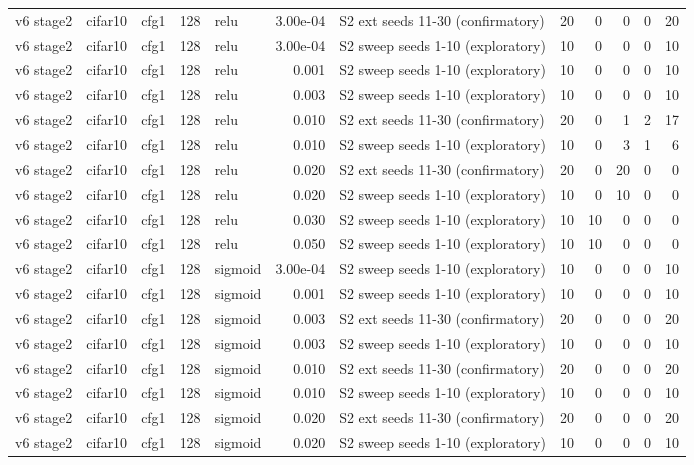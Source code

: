 \begin{table}[htbp]
{\begin{tabular}{@{}lllrlrlrrrrr@{}}
v6 stage2 & cifar10 & cfg1 & 128 & relu & 3.00e-04 & S2 ext seeds 11-30 (confirmatory) & 20 & 0 & 0 & 0 & 20 \\
v6 stage2 & cifar10 & cfg1 & 128 & relu & 3.00e-04 & S2 sweep seeds 1-10 (exploratory) & 10 & 0 & 0 & 0 & 10 \\
v6 stage2 & cifar10 & cfg1 & 128 & relu & 0.001 & S2 sweep seeds 1-10 (exploratory) & 10 & 0 & 0 & 0 & 10 \\
v6 stage2 & cifar10 & cfg1 & 128 & relu & 0.003 & S2 sweep seeds 1-10 (exploratory) & 10 & 0 & 0 & 0 & 10 \\
v6 stage2 & cifar10 & cfg1 & 128 & relu & 0.010 & S2 ext seeds 11-30 (confirmatory) & 20 & 0 & 1 & 2 & 17 \\
v6 stage2 & cifar10 & cfg1 & 128 & relu & 0.010 & S2 sweep seeds 1-10 (exploratory) & 10 & 0 & 3 & 1 & 6 \\
v6 stage2 & cifar10 & cfg1 & 128 & relu & 0.020 & S2 ext seeds 11-30 (confirmatory) & 20 & 0 & 20 & 0 & 0 \\
v6 stage2 & cifar10 & cfg1 & 128 & relu & 0.020 & S2 sweep seeds 1-10 (exploratory) & 10 & 0 & 10 & 0 & 0 \\
v6 stage2 & cifar10 & cfg1 & 128 & relu & 0.030 & S2 sweep seeds 1-10 (exploratory) & 10 & 10 & 0 & 0 & 0 \\
v6 stage2 & cifar10 & cfg1 & 128 & relu & 0.050 & S2 sweep seeds 1-10 (exploratory) & 10 & 10 & 0 & 0 & 0 \\
v6 stage2 & cifar10 & cfg1 & 128 & sigmoid & 3.00e-04 & S2 sweep seeds 1-10 (exploratory) & 10 & 0 & 0 & 0 & 10 \\
v6 stage2 & cifar10 & cfg1 & 128 & sigmoid & 0.001 & S2 sweep seeds 1-10 (exploratory) & 10 & 0 & 0 & 0 & 10 \\
v6 stage2 & cifar10 & cfg1 & 128 & sigmoid & 0.003 & S2 ext seeds 11-30 (confirmatory) & 20 & 0 & 0 & 0 & 20 \\
v6 stage2 & cifar10 & cfg1 & 128 & sigmoid & 0.003 & S2 sweep seeds 1-10 (exploratory) & 10 & 0 & 0 & 0 & 10 \\
v6 stage2 & cifar10 & cfg1 & 128 & sigmoid & 0.010 & S2 ext seeds 11-30 (confirmatory) & 20 & 0 & 0 & 0 & 20 \\
v6 stage2 & cifar10 & cfg1 & 128 & sigmoid & 0.010 & S2 sweep seeds 1-10 (exploratory) & 10 & 0 & 0 & 0 & 10 \\
v6 stage2 & cifar10 & cfg1 & 128 & sigmoid & 0.020 & S2 ext seeds 11-30 (confirmatory) & 20 & 0 & 0 & 0 & 20 \\
v6 stage2 & cifar10 & cfg1 & 128 & sigmoid & 0.020 & S2 sweep seeds 1-10 (exploratory) & 10 & 0 & 0 & 0 & 10 \\

\end{tabular}}
\end{table}
